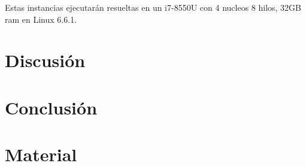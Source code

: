 \documentclass[spanish, a4paper, 12pt, twoside, openany,final]{book}
\numberwithin{equation}{section}                %
\begin{document}
Estas instancias ejecutarán resueltas en un i7-8550U con 4 nucleos 8 hilos, 32GB ram en Linux 6.6.1.
 
\clearpage

\chapter{Discusión}
    
\clearpage

\chapter{Conclusión}
    
\clearpage

\newpage
\renewcommand\refname{Referencias}          %
{                           %
}

\newpage
\renewcommand{\appendixpagename}{Apéndices}     %

\appendix   %

\chapter{Material}                

\clearpage


%    

\end{document}
